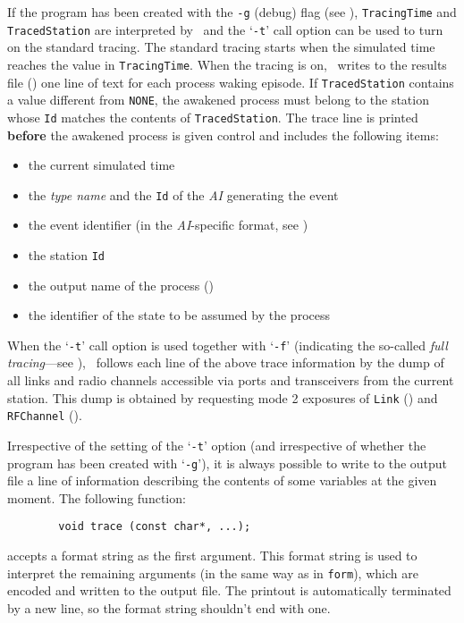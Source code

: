 If the program has been created with the {\tt -g} (debug) flag (see
), {\tt TracingTime} and {\tt TracedStation} are
interpreted by
\smurph\ and the `{\tt -t}' call
option can be used to turn on the standard tracing.
The standard tracing starts when the simulated time reaches the value in
{\tt TracingTime}.
When the tracing is on, \smurph\ writes to the results file
()
one line of text for each process waking episode.
If {\tt TracedStation} contains a value different from {\tt NONE},
the awakened process must belong to the station whose {\tt Id} matches the
contents of {\tt TracedStation}.
The trace line is printed {\bf before} the awakened process is given
control and includes the following items:
\begin{itemize}
\item
the current simulated time
\item
the {\em type name\/} and the {\tt Id} of the {\em AI\/} generating the event
\item
the event identifier (in the {\em AI\/}-specific format, see )
\item
the station {\tt Id}
\item
the output name of the process ()
\item
the identifier of the state to be assumed by the process
\end{itemize}

When the `{\tt -t}' call option is used together with `{\tt -f}'
(indicating the
so-called {\em full tracing\/}---see ),
\smurph\ follows each line of the above trace information by the
dump of all links and radio channels accessible via
ports and transceivers from the current station.
This dump is obtained by requesting mode 2 exposures of
{\tt Link} () and {\tt RFChannel}
().

Irrespective of the setting of the `{\tt -t}' option (and irrespective of
whether the program has been created with `{\tt -g}'), it is always possible
to write to the output file a line of information describing the contents
of some variables at the given moment.
The following function:
\begin{verbatim}
        void trace (const char*, ...);
\end{verbatim}
accepts a format string as the first argument.
This format string is used to interpret the remaining arguments (in the same way
as in {\tt form}), which are encoded and written to the output file.
The printout is automatically terminated by a new line, so the format string
shouldn't end with one.

